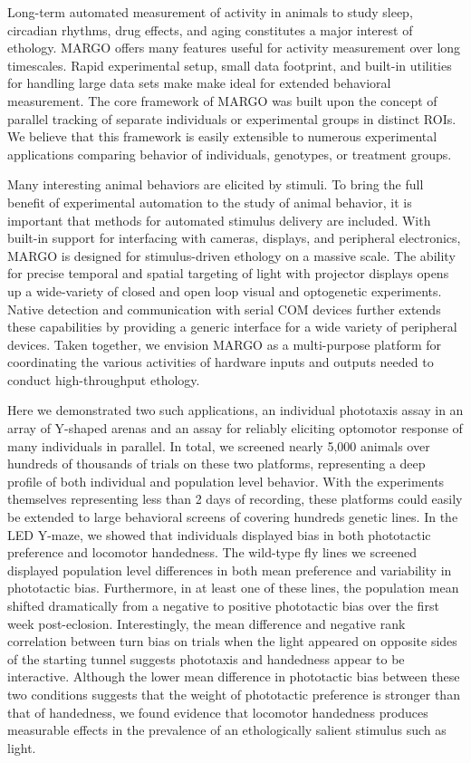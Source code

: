 \documentclass[10pt]{article}
\begin{document}
\begin{multicols}{2}
Long-term automated measurement of activity in animals to study sleep, circadian rhythms, drug effects, and aging constitutes a major interest of ethology. MARGO offers many features useful for activity measurement over long timescales. Rapid experimental setup, small data footprint, and built-in utilities for handling large data sets make make ideal for extended behavioral measurement. The core framework of MARGO was built upon the concept of parallel tracking of separate individuals or experimental groups in distinct ROIs. We believe that this framework is easily extensible to numerous experimental applications comparing behavior of individuals, genotypes, or treatment groups.  

Many interesting animal behaviors are elicited by stimuli. To bring the full benefit of experimental automation to the study of animal behavior, it is important that methods for automated stimulus delivery are included. With built-in support for interfacing with cameras, displays, and peripheral electronics, MARGO is designed for stimulus-driven ethology on a massive scale. The ability for precise temporal and spatial targeting of light with projector displays opens up a wide-variety of closed and open loop visual and optogenetic experiments. Native detection and communication with serial COM devices further extends these capabilities by providing a generic interface for a wide variety of peripheral devices. Taken together, we envision MARGO as a multi-purpose platform for coordinating the various activities of hardware inputs and outputs needed to conduct high-throughput ethology. 

Here we demonstrated two such applications, an individual phototaxis assay in an array of Y-shaped arenas and an assay for reliably eliciting optomotor response of many individuals in parallel. In total, we screened nearly 5,000 animals over hundreds of thousands of trials on these two platforms, representing a deep profile of both individual and population level behavior. With the experiments themselves representing less than 2 days of recording, these platforms could easily be extended to large behavioral screens of covering hundreds genetic lines. In the LED Y-maze, we showed that individuals displayed bias in both phototactic preference and locomotor handedness. The wild-type fly lines we screened displayed population level differences in both mean preference and variability in phototactic bias. Furthermore, in at least one of these lines, the population mean shifted dramatically from a negative to positive phototactic bias over the first week post-eclosion. Interestingly, the mean difference and negative rank correlation between turn bias on trials when the light appeared on opposite sides of the starting tunnel suggests phototaxis and handedness appear to be interactive. Although the lower mean difference in phototactic bias between these two conditions suggests that the weight of phototactic preference is stronger than that of handedness, we found evidence that locomotor handedness produces measurable effects in the prevalence of an ethologically salient stimulus such as light. 


\end{multicols}
\end{document}
